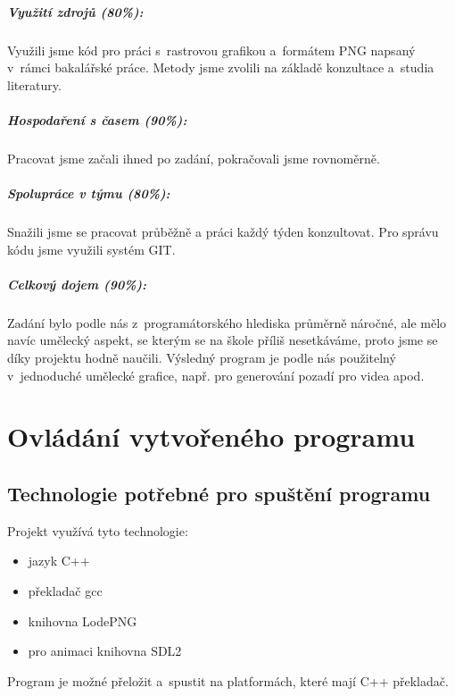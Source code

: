 \documentclass[12pt,a4paper,titlepage,final]{report}
\begin{document}
\paragraph{Využití zdrojů (80\%):}
Využili jsme kód pro práci s~rastrovou grafikou a~formátem PNG napsaný v~rámci
bakalářské práce. Metody jsme zvolili na základě konzultace a~studia
literatury.

\paragraph{Hospodaření s časem (90\%):}
Pracovat jsme začali ihned po zadání, pokračovali jsme rovnoměrně.

\paragraph{Spolupráce v týmu (80\%):}
Snažili jsme se pracovat průběžně a práci každý týden konzultovat. Pro
správu kódu jsme využili systém GIT.

\paragraph{Celkový dojem (90\%):}
Zadání bylo podle nás z~programátorského hlediska průměrně náročné, ale
mělo navíc umělecký aspekt, se kterým se na škole příliš nesetkáváme,
proto jsme se díky projektu hodně naučili. Výsledný program je podle
nás použitelný v~jednoduché umělecké grafice, např. pro generování pozadí
pro videa apod.

\chapter{Ovládání vytvořeného programu}

\section{Technologie potřebné pro spuštění programu}
Projekt využívá tyto technologie:

\begin{itemize}
\item jazyk C++
\item překladač gcc
\item knihovna LodePNG
\item pro animaci knihovna SDL2
\end{itemize}

Program je možné přeložit a~spustit na platformách, které mají C++
překladač.
\end{document}
